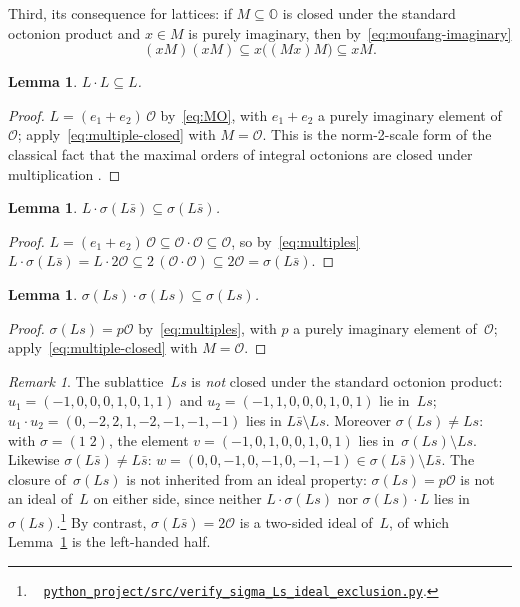 \documentclass[twoside,english]{paper}
\numberwithin{equation}{section}
\numberwithin{figure}{section}
\newtheorem{lemma}[theorem]{Lemma}
\theoremstyle{definition}
\theoremstyle{remark}
\newtheorem{remark}[theorem]{Remark}
\newcommand{\OO}{\mathbb{O}}          %
\newcommand{\MO}{\mathcal{O}}         %
\newcommand{\scriptref}[1]{\cite{repo}~%
  \href{https://github.com/koeplinger/leech\_alg/blob/main/python\_project/src/#1}%
  {\nolinkurl{python_project/src/#1}}}
\begin{document}
Third, its consequence for lattices: if $M \subseteq \OO$ is closed
under the standard octonion product and $x \in M$ is purely imaginary,
then
by~\eqref{eq:moufang-imaginary}
\begin{equation}\label{eq:multiple-closed}
  (xM)(xM) \subseteq x\bigl((Mx)M\bigr) \subseteq xM .
\end{equation}

\begin{lemma}\label{lem:L-order}
$L \cdot L \subseteq L$.
\end{lemma}

\begin{proof}
$L = (e_1 + e_2)\,\MO$ by~\eqref{eq:MO}, with $e_1 + e_2$ a purely
imaginary element of~$\MO$; apply~\eqref{eq:multiple-closed} with
$M = \MO$.  This is the norm-2-scale form of the classical fact that
the maximal orders of integral octonions are closed under
multiplication \cite{Coxeter1946, ConwaySmith2003}.
\end{proof}

\begin{lemma}\label{lem:L-sigmaLsbar}
$L \cdot \sigma(L\bar{s}) \subseteq \sigma(L\bar{s})$.
\end{lemma}

\begin{proof}
$L = (e_1 + e_2)\,\MO \subseteq \MO \cdot \MO \subseteq \MO$, so
by~\eqref{eq:multiples}
$L \cdot \sigma(L\bar s) = L \cdot 2\MO \subseteq 2\,(\MO \cdot \MO)
\subseteq 2\MO = \sigma(L\bar s)$.
\end{proof}

\begin{lemma}\label{lem:sigmaLs-closed}
$\sigma(Ls) \cdot \sigma(Ls) \subseteq \sigma(Ls)$.
\end{lemma}

\begin{proof}
$\sigma(Ls) = p\MO$ by~\eqref{eq:multiples}, with $p$ a purely
imaginary element of~$\MO$; apply~\eqref{eq:multiple-closed} with
$M = \MO$.
\end{proof}

\begin{remark}\label{rem:Ls-not-closed}
The sublattice~$Ls$ is \emph{not} closed under the standard octonion
product: $u_1 = (-1, 0, 0, 0, 1, 0, 1, 1)$ and
$u_2 = (-1, 1, 0, 0, 0, 1, 0, 1)$ lie in~$Ls$;
$u_1 \cdot u_2 = (0, -2, 2, 1, -2, -1, -1, -1)$ lies in
$L\bar{s} \setminus Ls$.  Moreover $\sigma(Ls) \ne Ls$: with
$\sigma = (1\;2)$, the
element $v = (-1, 0, 1, 0, 0, 1, 0, 1)$ lies in~$\sigma(Ls)
\setminus Ls$.  Likewise $\sigma(L\bar s) \ne
L\bar s$: $w = (0, 0, -1, 0, -1, 0, -1, -1) \in \sigma(L\bar s)
\setminus L\bar s$.  The closure of~$\sigma(Ls)$ is not inherited
from an ideal property: $\sigma(Ls) = p\MO$ is not an ideal of~$L$ on
either side, since neither $L \cdot \sigma(Ls)$ nor
$\sigma(Ls) \cdot L$ lies
in~$\sigma(Ls)$.\footnote{\scriptref{verify\_sigma\_Ls\_ideal\_exclusion.py}.}
By contrast, $\sigma(L\bar s) = 2\MO$ is a two-sided ideal of~$L$, of
which Lemma~\ref{lem:L-sigmaLsbar} is the left-handed half.
\end{remark}
\end{document}
